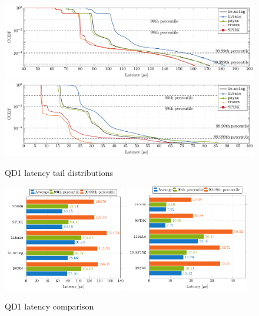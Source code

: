 \begin{figure}
  \centering
   {\includegraphics[width=\textwidth]{figures/latency-ccdf-read} \label{fig:ccdf-read}}
   {\includegraphics[width=\textwidth]{figures/latency-ccdf-write} \label{fig:ccdf-write}}
  \caption{QD1 latency tail distributions}
  \label{fig:ccdf}
\end{figure}

\begin{figure}
  \centering
   {\includegraphics[width=0.48\textwidth]{figures/latency-read-xbar} \label{fig:lat-read}}
   {\includegraphics[width=0.48\textwidth]{figures/latency-write-xbar} \label{fig:lat-write}}
  \caption{QD1 latency comparison}
  \label{fig:lat-qd1}
\end{figure}

